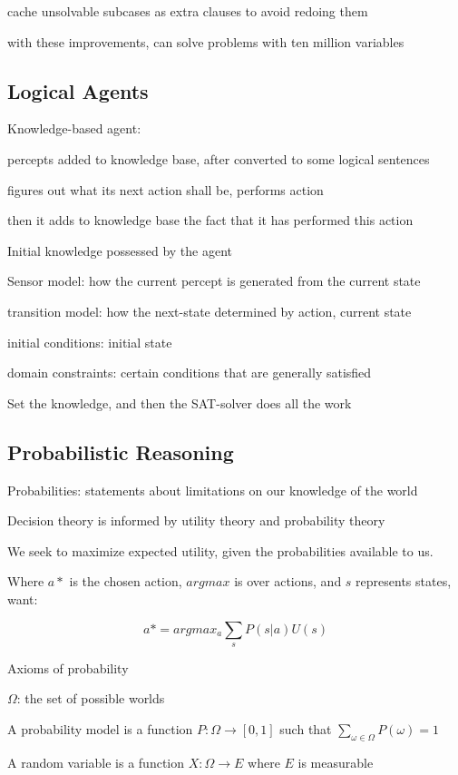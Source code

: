 \documentclass[12pt]{article}
\begin{document}
cache unsolvable subcases as extra clauses to avoid redoing them

with these improvements, can solve problems with ten million variables

\subsection{Logical Agents}

\noindent
Knowledge-based agent:

percepts added to knowledge base, after converted to some logical sentences

figures out what its next action shall be, performs action

then it adds to knowledge base the fact that it has performed this action

\noindent
Initial knowledge possessed by the agent

Sensor model: how the current percept is generated from the current state

transition model: how the next-state determined by action, current state

initial conditions: initial state

domain constraints: certain conditions that are generally satisfied

\noindent
Set the knowledge, and then the SAT-solver does all the work

\subsection{Probabilistic Reasoning}

\noindent
Probabilities: statements about limitations on our knowledge of the world

\noindent
Decision theory is informed by utility theory and probability theory

We seek to maximize expected utility, given the probabilities available to us.

Where $a*$ is the chosen action, $argmax$ is over actions, and $s$ represents states, want:

$$a* = argmax_a \sum_s P(s|a) U(s)$$

\noindent
Axioms of probability

$\Omega$: the set of possible worlds

A probability model is a function $P: \Omega \to [0, 1]$ such that $\sum_{\omega \in \Omega}P(\omega) = 1$

A random variable is a function $X: \Omega \to E$ where $E$ is measurable
\end{document}
